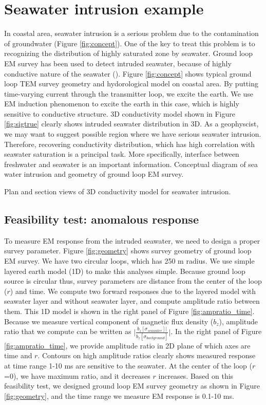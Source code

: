 \documentclass{segabs}
\begin{document}
\section*{Seawater intrusion example}
In coastal area, seawater intrusion is a serious problem due to the contamination of groundwater (Figure \ref{fig:concept}). One of the key to treat this problem is to recognizing the distribution of highly saturated zone by seawater. Ground loop EM survey has been used to detect intruded seawater, because of highly conductive nature of the seawater (\cite{Mills1988}). Figure \ref{fig:concept} shows typical ground loop TEM survey geometry and hydorological model on coastal area. By putting time-varying current through the transmitter loop, we excite the earth. We use EM induction phenomenon to excite the earth in this case, which is highly sensitive to conductive structure. 3D conductivity model shown in Figure \ref{fig:sigtrue} clearly shows intruded seawater distribution in 3D. As a geophyscist, we may want to suggest possible region where we have serious seawater intrusion. Therefore, recovering conductivity distribution, which has high correlation with seawater saturation is a principal task. More specifically, interface between freshwater and seawater is an important information.
{Conceptual diagram of sea water intrusion and geometry of ground loop EM survey.}

{Plan and section views of 3D conductivity model for seawater intrusion.}

\subsection*{Feasibility test: anomalous response}
To measure EM response from the intruded seawater, we need to design a proper survey parameter. Figure \ref{fig:geometry} shows survey geometry of ground loop EM survey. We have two circular loops, which has 250 m radius. We use simple layered earth model (1D) to make this analyses simple. Because ground loop source is circular thus, survey parameters are distance from the center of the loop ($r$) and time. We compute two forward responses due to the layered model with seawater layer and without seawater layer, and compute amplitude ratio between them. This 1D model is shown in the right panel of Figure \ref{fig:ampratio_time}. Because we measure vertical component of magnetic flux density ($b_z$), amplitude ratio that we compute can be written as $\Big|\frac{b_z[\sigma_{seawater}]|}{b_z[\sigma_{background}]}\Big|$. In the right panel of Figure \ref{fig:ampratio_time}, we provide amplitude ratio in 2D plane of which axes are time and $r$. Contours on high amplitude ratios clearly shows measured response at time range 1-10 ms are sensitive to the seawater. At the center of the loop ($r$=0), we have maximum ratio, and it decreases $r$ increases. Based on this feasibility test, we designed ground loop EM survey geometry as shown in Figure \ref{fig:geometry}, and the time range we measure EM response is 0.1-10 ms.
\end{document}
